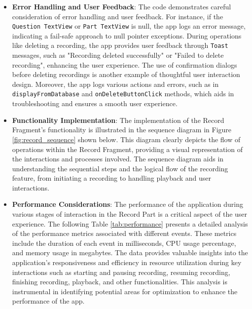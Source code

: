 \documentclass[conference,10pt,letterpaper]{IEEEtran}
\begin{document}
\begin{itemize}
		\item \textbf{Error Handling and User Feedback}: 
		The code demonstrates careful consideration of error handling and user feedback. For instance, if the \texttt{Question TextView} or \texttt{Part TextView} is null, the app logs an error message, indicating a fail-safe approach to null pointer exceptions. During operations like deleting a recording, the app provides user feedback through \texttt{Toast} messages, such as "Recording deleted successfully" or "Failed to delete recording", enhancing the user experience. The use of confirmation dialogs before deleting recordings is another example of thoughtful user interaction design. Moreover, the app logs various actions and errors, such as in \texttt{displayFromDatabase} and \texttt{onDeleteButtonClick} methods, which aids in troubleshooting and ensures a smooth user experience.
		
		\item \textbf{Functionality Implementation}: 
		The implementation of the Record Fragment's functionality is illustrated in the sequence diagram in Figure \ref{fig:record_sequence} shown below. This diagram clearly depicts the flow of operations within the Record Fragment, providing a visual representation of the interactions and processes involved. The sequence diagram aids in understanding the sequential steps and the logical flow of the recording feature, from initiating a recording to handling playback and user interactions.

		\newpage
		\item \textbf{Performance Considerations}: 
		The performance of the application during various stages of interaction in the Record Part is a critical aspect of the user experience. The following Table \ref{tab:performance} presents a detailed analysis of the performance metrics associated with different events. These metrics include the duration of each event in milliseconds, CPU usage percentage, and memory usage in megabytes. The data provides valuable insights into the application's responsiveness and efficiency in resource utilization during key interactions such as starting and pausing recording, resuming recording, finishing recording, playback, and other functionalities. This analysis is instrumental in identifying potential areas for optimization to enhance the performance of the app.
		
	\end{itemize}
	
\end{document}
